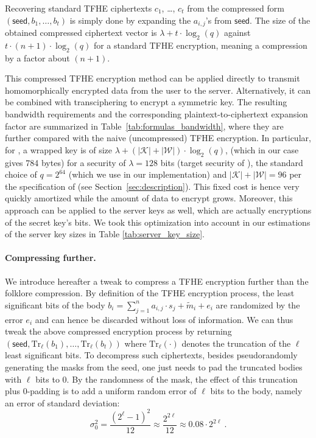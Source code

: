 \smallskip

Recovering standard TFHE ciphertexts $c_1$, \ldots, $c_t$ from the compressed form $(\mathsf{seed}, b_1, \ldots, b_t)$ is simply done by expanding the $a_{i,j}$'s from $\mathsf{seed}$. The size of the obtained compressed ciphertext vector is $\lambda + t \cdot \log_2(q)$ against $t \cdot (n+1) \cdot \log_2(q)$ for a standard TFHE encryption, meaning a compression by a factor about $(n+1)$. 

This compressed TFHE encryption method can be applied directly to transmit homomorphically encrypted data from the user to the server. Alternatively, it can be combined with transciphering to encrypt a symmetric key. The resulting bandwidth requirements and the corresponding plaintext-to-ciphertext expansion factor are summarized in Table~\ref{tab:formulas_bandwidth}, where they are further compared with the naive (uncompressed) TFHE encryption. In particular, for \coolName, a wrapped key is of size $\lambda + (|\mathcal K| + |\mathcal W|) \cdot \log_2(q)$, (which in our case gives 784 bytes) for a security of $\lambda = 128$ bits (target security of \coolName), the standard choice of $q= 2^{64}$ (which we use in our implementation) and $|\mathcal K| + |\mathcal W| = 96$ per the specification of \coolName (see Section~\ref{sec:description}). This fixed cost is hence very quickly amortized while the amount of data to encrypt grows.
Moreover, this approach can be applied to the server keys as well, which are actually encryptions of the secret key's bits. We took this optimization into account in our estimations of the server key sizes in Table \ref{tab:server_key_size}. 

\paragraph{Compressing further.}

We introduce hereafter a tweak to compress a TFHE encryption further than the folklore compression. By definition of the TFHE encryption process, the least significant bits of the body $b_i = \sum_{j=1}^n a_{i,j} \cdot s_j + \tilde{m}_i + e_i$ are randomized by the error $e_i$ and can hence be discarded without loss of information. We can thus tweak the above compressed encryption process by returning $(\mathsf{seed}, \mathrm{Tr}_\ell(b_1), \ldots, \mathrm{Tr}_\ell(b_t))$ where $\mathrm{Tr}_\ell(\cdot)$ denotes the truncation of the $\ell$ least significant bits. To decompress such ciphertexts, besides pseudorandomly generating the masks from the seed, one just needs to pad the truncated bodies with $\ell$ bits to $0$. By the randomness of the mask, the effect of this truncation plus $0$-padding is to add a uniform random error of $\ell$ bits to the body, namely an error of standard deviation: 
$$\sigma_0^2  = \frac{(2^\ell - 1)^2}{12} \approx \frac{2^{2\ell}}{12} \approx 0.08 \cdot 2^{2\ell} ~.$$

